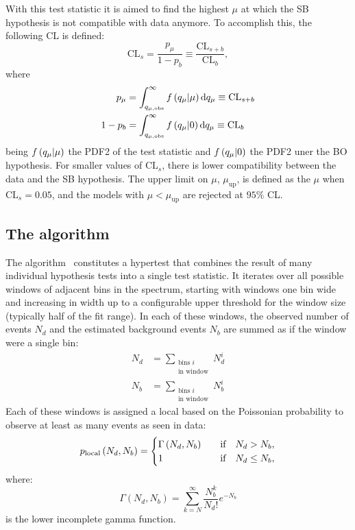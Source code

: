 With this test statistic it is aimed to find the highest \(\mu\) at which the \ac{SB} hypothesis is not compatible with data anymore. To accomplish this, the following \ac{CL} is defined:
\begin{equation}
    \text{CL}_s = \frac{p_\mu}{1 - p_b} \equiv \frac{\text{CL}_{s+b}}{\text{CL}_b},
\end{equation}
where
\begin{align}
    p_{\mu} &= \int_{q_{\mu, \text{obs}}}^{\infty} f \left(q_{\mu} | \mu\right) \dd{\ensuremath{q_{\mu}}} \equiv \text{CL}_{s+b}\\
    1 - p_{b} &= \int_{q_{\mu, \text{obs}}}^{\infty} f \left(q_{\mu} | 0\right) \dd{\ensuremath{q_{\mu}}} \equiv \text{CL}_{b}
\end{align}
being \(f \left(q_{\mu} | \mu\right)\) the \ac{PDF2} of the test statistic \qmu and \(f \left(q_{\mu} | 0\right)\) the \ac{PDF2} uner the \ac{BO} hypothesis. For smaller values of \(\text{CL}_s\), there is lower compatibility between the data and the \ac{SB} hypothesis. The upper limit on \(\mu\), \(\mu_{\text{up}}\), is defined as the \(\mu\) when \(\text{CL}_s = 0.05\), and the models with \(\mu < \mu_{\text{up}}\) are rejected at \(95\%\) \ac{CL}.




\subsection{The \bh algorithm}
\label{subsec:strategy:stat_treatment:bh}


The \bh algorithm~\cite{BumpHunter,pyBumpHunter} constitutes a hypertest that combines the result of many individual hypothesis tests into a single test statistic. It iterates over all possible windows of adjacent bins in the spectrum, starting with windows one bin wide and increasing in width up to a configurable upper threshold for the window size (typically half of the fit range). In each of these windows, the observed number of events \(N_d\) and the estimated background events \(N_b\) are summed as if the window were a single bin:
\begin{align}
    N_d &= \sum_{ \substack{ \text{bins \(i\)} \\ \text{in window} } } N_d^i\\
    N_b &= \sum_{ \substack{ \text{bins \(i\)} \\ \text{in window} } } N_b^i
\end{align}
Each of these windows is assigned a local \pval based on the Poissonian probability to observe at least as many events as seen in data:
\begin{equation}
    p_{\text{local}} \left(N_d, N_b\right) = 
    \begin{cases}
        \Gamma \left(N_d, N_b\right)    &\qif   N_d > N_b,\\
        1                               &\qif   N_d \leq N_b,
    \end{cases}
\end{equation}
where:
\begin{equation}
    \Gamma \left(N_d, N_b\right) = \sum_{k=N}^{\infty} \frac{N_b^k}{N_d!} e^{-N_b}
\end{equation}
is the lower incomplete gamma function.

